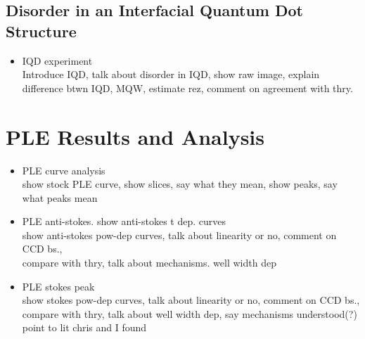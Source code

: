 \subsection{Disorder in an Interfacial Quantum Dot Structure}
\begin{itemize}
Our final disorder measurement was taken for an interfacial quantum dot (IQD) sample. Due to high signal averaging for the MQW samples, we weren't able to see the energy deviations we theoretically should have. Therefore, we took $\mu$PL data on a 5-period, varying well and barrier thickness GaAs/AlGaAs quantum well. Due to the growth process of the IQD sample large well width variations translated into three-dimensional exciton confinement CITE Galan/Rohan, rather than just the one QW confinement dimension. Additionally, due to the larger well-width variations, disorder influences on PL energy were much larger. Figure \ref{iqdmap}. Though the sample was a five-period structure, the increased structural disorder allowed us to see larger variations in PL image as seen in \ref{iqdDev}.



\item IQD experiment\\
\* Introduce IQD, talk about disorder in IQD, show raw image, explain difference btwn IQD, MQW, estimate rez, comment on agreement with thry.
\end{itemize}


\section{PLE Results and Analysis}
\begin{itemize}
\item PLE curve analysis\\
show stock PLE curve, show slices, say what they mean, show peaks, say what peaks mean
\item PLE anti-stokes.
show anti-stokes t dep. curves\\
show anti-stokes pow-dep curves, talk about linearity or no, comment on CCD bs., \\
compare with thry, talk about mechanisms. well width dep
\item PLE stokes peak\\
show stokes pow-dep curves, talk about linearity or no, comment on CCD bs., \\
compare with thry, talk about well width dep, say mechanisms understood(?) point to lit chris and I found

\end{itemize}

